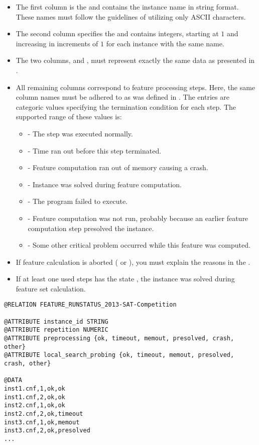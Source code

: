 \begin{itemize}
	\item The first column is the  and contains the instance name in string format. These names 
  		must follow the guidelines of utilizing only ASCII characters.
  	\item The second column specifies the  and contains integers, starting at $1$ and increasing in 
  		increments of $1$ for each instance with the same name.  
  	\item The two columns,  and , must represent exactly the same data as
  		presented in .
  	\item All remaining columns correspond to feature processing steps. Here, the same column names  
  		must be adhered to as was defined in . The entries are categoric values
		specifying the termination condition for each step. The supported range of these values is: 
        		\begin{itemize}
        			\item {} - The step was executed normally.
        			\item {} - Time ran out before this step terminated.
       		 		\item {} - Feature computation ran out of memory causing a crash.
					\item {} - Instance was solved during feature computation.
        			\item {} - The program failed to execute.
        			\item {} - Feature computation was not run,
                    probably because an earlier feature computation step
                    presolved the instance.
        			\item {} - Some other critical problem occurred while this feature was computed.
        		\end{itemize}
  	\item If feature calculation is aborted ( or ), you must explain the reasons in 
		the .
  	\item If at least one used steps has the state , the instance was solved during feature set calculation.
\end{itemize} 


\begin{lstlisting}[caption=Example feature\_runstatus.arff with two feature processing steps]
@RELATION FEATURE_RUNSTATUS_2013-SAT-Competition

@ATTRIBUTE instance_id STRING
@ATTRIBUTE repetition NUMERIC
@ATTRIBUTE preprocessing {ok, timeout, memout, presolved, crash, other}
@ATTRIBUTE local_search_probing {ok, timeout, memout, presolved, crash, other}

@DATA
inst1.cnf,1,ok,ok
inst1.cnf,2,ok,ok
inst2.cnf,1,ok,ok
inst2.cnf,2,ok,timeout
inst3.cnf,1,ok,memout
inst3.cnf,2,ok,presolved
...
\end{lstlisting}

